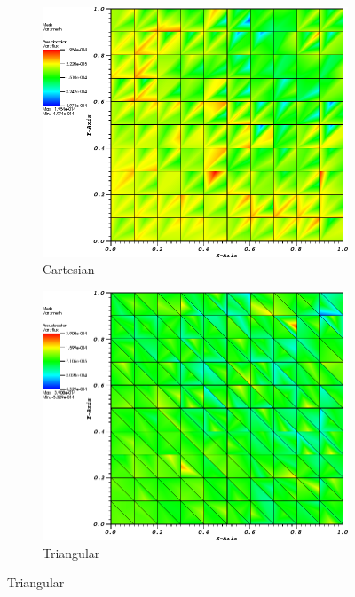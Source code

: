\begin{figure}
\centering
{
	\begin{subfigure}[b]{0.465\textwidth}
		\centering
		\label{subfig::cart_me_k2_lin_sol}
		\includegraphics[width=\textwidth]{figures/sec_BF/quad_err_cart_MV2.png}
		\caption{Cartesian}
	\end{subfigure}
	\hfill
	\begin{subfigure}[b]{0.465\textwidth}
		\centering
		\label{subfig::tri_me_k2_lin_sol}
		\includegraphics[width=\textwidth]{figures/sec_BF/quad_err_tri_MV2.png}
		\caption{Triangular}

\end{subfigure}}
\end{figure}
